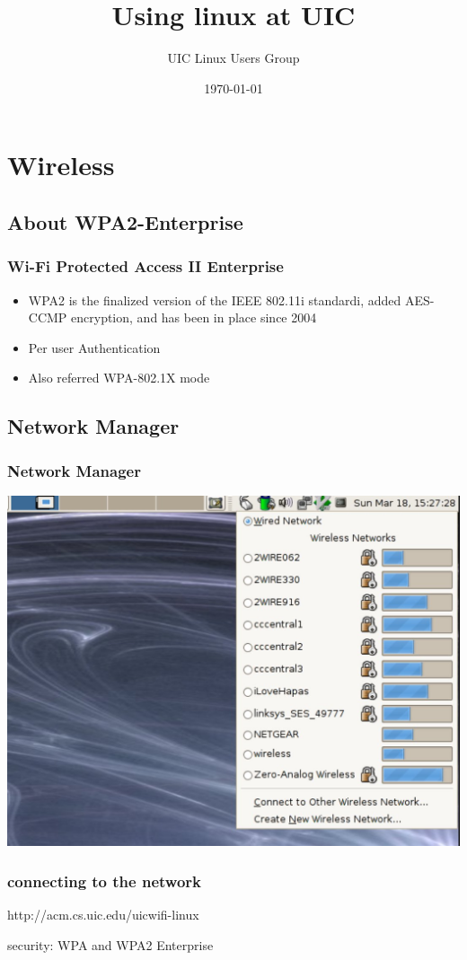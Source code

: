 \documentclass[hyperref={pdfpagelabels=false}]{beamer}
\title{Using linux at UIC}
\author{UIC Linux Users Group}
\date{\today}
\begin{document}
\frame{\titlepage}
\section{Wireless}
\subsection{About WPA2-Enterprise}
\frame
{
    \frametitle{Wi-Fi Protected Access II Enterprise}
    \begin{itemize}
    \item{WPA2 is the finalized version of the IEEE 802.11i standardi, added AES-CCMP encryption, and has been in place since 2004}
    \item{Per user Authentication}
    \item{Also referred WPA-802.1X mode}
    \end{itemize}
}
\subsection{Network Manager}
\frame
{
    \frametitle{Network Manager}
    
    \includegraphics[totalheight=0.7\textheight]{gnm.jpg}

}
\frame
{
    \frametitle{connecting to the network}
    http://acm.cs.uic.edu/uicwifi-linux

    security: WPA and  WPA2 Enterprise
}
\end{document}
